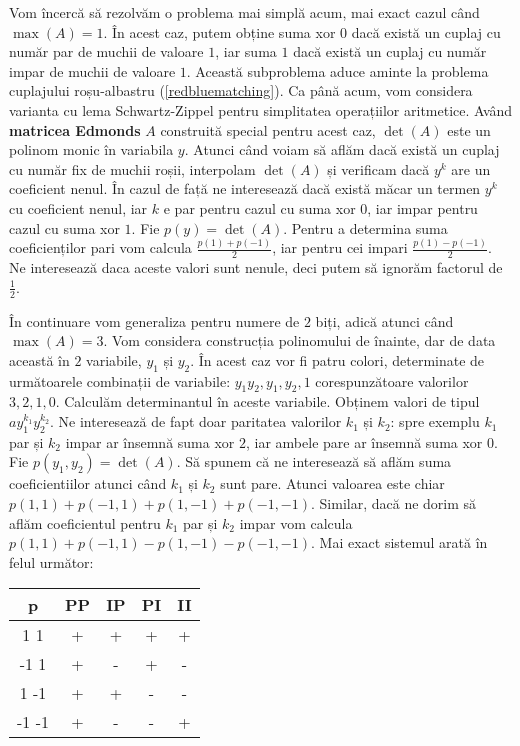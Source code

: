 Vom încercă să rezolvăm o problema mai simplă acum, mai exact cazul când $\max(A) = 1$. În acest caz, putem obține suma xor $0$ dacă există
un cuplaj cu număr par de muchii de valoare $1$, iar suma $1$ dacă există un cuplaj cu număr impar de muchii de valoare $1$. Această subproblema
aduce aminte la problema cuplajului roșu-albastru (\ref{redbluematching}). Ca până acum, vom considera varianta cu lema Schwartz-Zippel pentru
simplitatea operațiilor aritmetice. Având \textbf{matricea Edmonds} $A$ construită special pentru acest caz,
$\det(A)$ este un polinom monic în variabila $y$. Atunci când voiam să aflăm dacă există un cuplaj cu număr
fix de muchii roșii, interpolam $\det(A)$ și verificam dacă $y^{k}$ are un coeficient nenul. În cazul de față
ne interesează dacă există măcar un termen $y^{k}$ cu coeficient nenul, iar $k$ e par pentru cazul cu suma
xor $0$, iar impar pentru cazul cu suma xor $1$. Fie $p(y) = \det(A)$. Pentru a determina suma coeficienților
pari vom calcula $\frac{p(1) + p(-1)}{2}$, iar pentru cei impari $\frac{p(1) - p(-1)}{2}$. Ne interesează daca
aceste valori sunt nenule, deci putem să ignorăm factorul de $\frac{1}{2}$.

În continuare vom generaliza pentru numere de $2$ biți, adică atunci când $\max(A) = 3$. Vom considera construcția polinomului de înainte,
dar de data această în $2$ variabile, $y_{1}$ și $y_{2}$. În acest caz vor fi patru colori, determinate de următoarele combinații de variabile:
$y_{1}y_{2}, y_{1}, y_{2}, 1$ corespunzătoare valorilor $3, 2, 1, 0$. Calculăm determinantul în aceste variabile. Obținem valori de tipul
$a y_{1}^{k_{1}}y_{2}^{k_{2}}$. Ne interesează de fapt doar paritatea valorilor $k_{1}$ și $k_{2}$: spre exemplu $k_{1}$ par și $k_{2}$ impar ar
însemnă suma xor $2$, iar ambele pare ar însemnă suma xor $0$. Fie $p(y_{1}, y_{2}) = \det(A)$. Să spunem că ne interesează să aflăm suma
coeficientiilor atunci când $k_{1}$ și $k_{2}$ sunt pare. Atunci valoarea este chiar $p(1, 1) + p(-1, 1) + p(1, -1) + p(-1, -1)$.
Similar, dacă ne dorim să aflăm coeficientul pentru $k_{1}$ par și $k_{2}$ impar vom calcula $p(1, 1) + p(-1, 1) - p(1, -1) - p(-1, -1)$.
Mai exact sistemul arată în felul următor:

\begin{center}
\begin{tabular}{ c| c | c | c | c |}
p & PP & IP & PI & II \\
\hline
1 1 & + & + & + & + \\
\hline
-1 1 & + & - & + & - \\
\hline
1 -1 & + & + & - & - \\
\hline
-1 -1 & + & - & - & + \\
\hline
\end{tabular}
\end{center}

